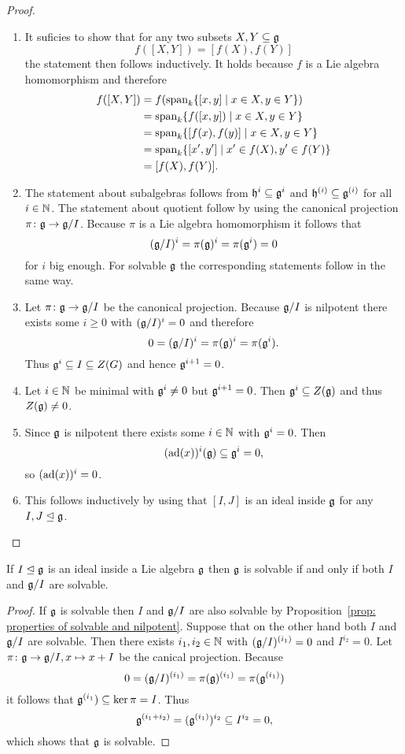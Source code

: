 \begin{proof}
 \begin{enumerate}[leftmargin=*]
  \item
   It suficies to show that for any two subsets $X, Y \subseteq \mathfrak{g}$
   \[
    f([X,Y])= [f(X),f(Y)]
   \]
   the statement then follows inductively. It holds because $f$ is a Lie algebra homomorphism and therefore
   \begin{align*}
    f([X,Y])
    &= f(\operatorname{span}_k \{[x, y] \mid x \in X, y \in Y\}) \\
    &= \operatorname{span}_k \{f([x, y]) \mid x \in X, y \in Y\} \\
    &= \operatorname{span}_k \{[f(x),f(y)] \mid x \in X, y \in Y\} \\
    &= \operatorname{span}_k \{[x',y'] \mid x' \in f(X), y' \in f(Y)\} \\
    &= [f(X),f(Y)].
   \end{align*}
  \item
   The statement about subalgebras follows from $\mathfrak{h}^i \subseteq \mathfrak{g}^i$ and $\mathfrak{h}^{(i)} \subseteq \mathfrak{g}^{(i)}$ for all $i \in \mathbb{N}$. The statement about quotient follow by using the canonical projection $\pi \colon \mathfrak{g} \to \mathfrak{g}/I$. Because $\pi$ is a Lie algebra homomorphism it follows that
   \[
    (\mathfrak{g}/I)^i = \pi(\mathfrak{g})^i = \pi(\mathfrak{g}^i) = 0
   \]
   for $i$ big enough. For solvable $\mathfrak{g}$ the corresponding statements follow in the same way.
  \item
   Let $\pi \colon \mathfrak{g} \to \mathfrak{g}/I$ be the canonical projection. Because $\mathfrak{g}/I$ is nilpotent there exists some $i \geq 0$ with $(\mathfrak{g}/I)^i = 0$ and therefore
   \[
    0 = (\mathfrak{g}/I)^i = \pi(\mathfrak{g})^i = \pi(\mathfrak{g}^i).
   \]
   Thus $\mathfrak{g}^i \subseteq I \subseteq Z(G)$ and hence $\mathfrak{g}^{i+1} = 0$.
  \item
   Let $i \in \mathbb{N}$ be minimal with $\mathfrak{g}^i \neq 0$ but $\mathfrak{g}^{i+1} = 0$. Then $\mathfrak{g}^i \subseteq Z(\mathfrak{g})$ and thus $Z(\mathfrak{g}) \neq 0$.
  \item
   Since $\mathfrak{g}$ is nilpotent there exists some $i \in \mathbb{N}$ with $\mathfrak{g}^i = 0$. Then
   \[
    (\operatorname{ad}(x))^i(\mathfrak{g}) \subseteq \mathfrak{g}^i = 0,
   \]
   so $(\operatorname{ad}(x))^i = 0$.
  \item
   This follows inductively by using that $[I,J]$ is an ideal inside $\mathfrak{g}$ for any $I,J \trianglelefteq \mathfrak{g}$.
 \end{enumerate}
\end{proof}


\begin{cor}\label{cor: solvable via ses}
 If $I \trianglelefteq \mathfrak{g}$ is an ideal inside a Lie algebra $\mathfrak{g}$ then $\mathfrak{g}$ is solvable if and only if both $I$ and $\mathfrak{g}/I$ are solvable.
\end{cor}
\begin{proof}
 If $\mathfrak{g}$ is solvable then $I$ and $\mathfrak{g}/I$ are also solvable by Proposition~\ref{prop: properties of solvable and nilpotent}. Suppose that on the other hand both $I$ and $\mathfrak{g}/I$ are solvable. Then there exists $i_1, i_2 \in \mathbb{N}$ with $(\mathfrak{g}/I)^{(i_1)} = 0$ and $I^{i_2} = 0$. Let $\pi \colon \mathfrak{g} \to \mathfrak{g}/I, x \mapsto x + I$ be the canical projection. Because
 \[
  0 = (\mathfrak{g}/I)^{(i_1)} = \pi(\mathfrak{g})^{(i_1)} = \pi(\mathfrak{g}^{(i_1)})
 \]
 it follows that $\mathfrak{g}^{(i_1}) \subseteq \ker \pi = I$. Thus
 \[
  \mathfrak{g}^{(i_1 + i_2)} = (\mathfrak{g}^{(i_1)})^{i_2} \subseteq I^{i_2} = 0,
 \]
 which shows that $\mathfrak{g}$ is solvable.
\end{proof}


